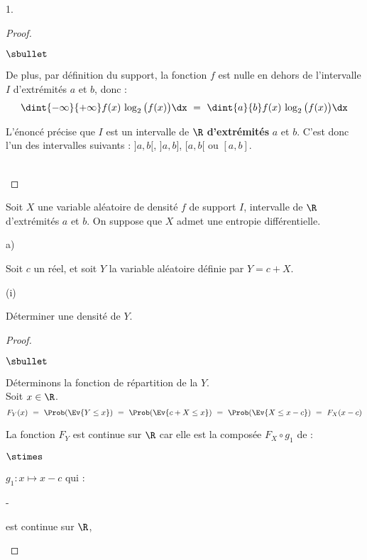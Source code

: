 \documentclass[11pt]{article}%
\begin{document}
\begin{noliste}{1.}
\begin{proof}
\begin{noliste}{$\sbullet$}
    \item De plus, par définition du support, la fonction $f$ est
      nulle en dehors de l'intervalle $I$ d'extrémités $a$ et $b$, donc :
      \[
        \dint{-\infty}{+\infty} f(x) \, \log_2\big(f(x)\big) \dx \ = \
        \dint{a}{b} f(x) \, \log_2\big(f(x)\big) \dx
      \]
    \end{noliste}

    \begin{remark}
      L'énoncé précise que $I$ est un intervalle de $\R$ {\bf
        d'extrémités} $a$ et $b$. C'est donc l'un des intervalles
      suivants : $]a,b[$, $]a,b]$, $[a,b[$ ou $[a,b]$.
    \end{remark}~\\[-1.4cm]
  \end{proof}
  
\item Soit $X$ une variable aléatoire de densité $f$ de support $I$,
  intervalle de $\R$ d'extrémités $a$ et $b$. On suppose que $X$ admet
  une entropie différentielle.
  \begin{noliste}{a)}
    \setlength{\itemsep}{2mm}
  \item Soit $c$ un réel, et soit $Y$ la variable aléatoire définie
    par $Y = c+X$.
    \begin{nonoliste}{(i)}
      \setlength{\itemsep}{2mm}
    \item Déterminer une densité de $Y$.
    \end{nonoliste}
  \end{noliste}
      
      \begin{proof}~
        \begin{noliste}{$\sbullet$}
        \item Déterminons la fonction de répartition de la \var $Y$.\\
          Soit $x \in \R$.
          \[
            F_Y(x) \ = \ \Prob(\Ev{Y \leq x}) \ = \ \Prob(\Ev{c+X \leq
              x}) \ = \ \Prob(\Ev{X \leq x-c}) \ = \ F_X(x-c)
          \]
          \conc{Finalement : $F_Y : x \mapsto F_X(x-c)$.}
          
        \item La fonction $F_Y$ est continue sur $\R$ car elle est la composée
          $F_X \circ g_1$ de :
          \begin{noliste}{$\stimes$}
          \item $g_1 : x \mapsto x-c$ qui :~\\[-.6cm]
          \end{noliste}
          \begin{liste}{-}
          \item est continue sur $\R$,
            

\end{liste}
\end{noliste}
\end{proof}
\end{noliste}
\end{document}
